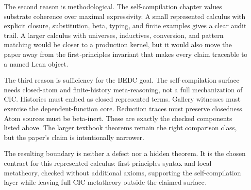The second reason is methodological.  The self-compilation chapter values
substrate coherence over maximal expressivity.  A small represented calculus
with explicit closure, substitution, beta, typing, and finite examples gives a
clear audit trail.  A larger calculus with universes, inductives, conversion,
and pattern matching would be closer to a production kernel, but it would also
move the paper away from the first-principles invariant that makes every claim
traceable to a named Lean object.

The third reason is sufficiency for the BEDC goal.  The self-compilation
surface needs closed-atom and finite-history meta-reasoning, not a full
mechanization of CIC.  Histories must embed as closed represented terms.
Gallery witnesses must exercise the dependent-function core.  Reduction traces
must preserve closedness.  Atom sources must be beta-inert.  These are exactly
the checked components listed above.  The larger textbook theorems remain the
right comparison class, but the paper's claim is intentionally narrower.

The resulting boundary is neither a defect nor a hidden theorem.  It is the
chosen contract for this represented calculus: first-principles syntax and
local metatheory, checked without additional axioms, supporting the
self-compilation layer while leaving full CIC metatheory outside the claimed
surface.
